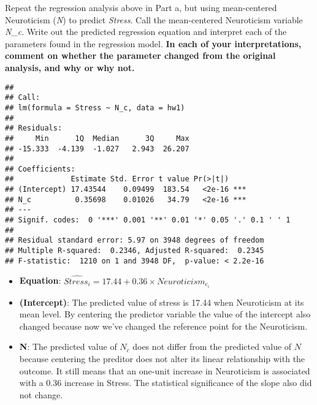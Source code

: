 \documentclass[
]{article}
\newenvironment{Shaded}{\begin{snugshade}}{\end{snugshade}}
\newcommand{\AttributeTok}[1]{\textcolor[rgb]{0.13,0.29,0.53}{#1}}
\newcommand{\ConstantTok}[1]{\textcolor[rgb]{0.56,0.35,0.01}{#1}}
\newcommand{\DocumentationTok}[1]{\textcolor[rgb]{0.56,0.35,0.01}{\textbf{\textit{#1}}}}
\newcommand{\FunctionTok}[1]{\textcolor[rgb]{0.13,0.29,0.53}{\textbf{#1}}}
\newcommand{\NormalTok}[1]{#1}
\newcommand{\OtherTok}[1]{\textcolor[rgb]{0.56,0.35,0.01}{#1}}
\newcommand{\SpecialCharTok}[1]{\textcolor[rgb]{0.81,0.36,0.00}{\textbf{#1}}}
\begin{document}
Repeat the regression analysis above in Part a, but using mean-centered
Neuroticism (\emph{N}) to predict \emph{Stress}. Call the mean-centered
Neuroticism variable \emph{N\_c}. Write out the predicted regression
equation and interpret each of the parameters found in the regression
model. \textbf{In each of your interpretations, comment on whether the
parameter changed from the original analysis, and why or why not.}

\begin{Shaded}
\end{Shaded}

\begin{verbatim}
## 
## Call:
## lm(formula = Stress ~ N_c, data = hw1)
## 
## Residuals:
##     Min      1Q  Median      3Q     Max 
## -15.333  -4.139  -1.027   2.943  26.207 
## 
## Coefficients:
##             Estimate Std. Error t value Pr(>|t|)    
## (Intercept) 17.43544    0.09499  183.54   <2e-16 ***
## N_c          0.35698    0.01026   34.79   <2e-16 ***
## ---
## Signif. codes:  0 '***' 0.001 '**' 0.01 '*' 0.05 '.' 0.1 ' ' 1
## 
## Residual standard error: 5.97 on 3948 degrees of freedom
## Multiple R-squared:  0.2346, Adjusted R-squared:  0.2345 
## F-statistic:  1210 on 1 and 3948 DF,  p-value: < 2.2e-16
\end{verbatim}

\begin{itemize}
\item
  \textbf{Equation}:
  \(\widehat{Stress_i} = 17.44 + 0.36 \times Neuroticism_{c_i}\)
\item
  \textbf{(Intercept)}: The predicted value of stress is 17.44 when
  Neuroticism at its mean level. By centering the predictor variable the
  value of the intercept also changed because now we've changed the
  reference point for the Neuroticism.
\item
  \textbf{N}: The predicted value of \(N_c\) does not differ from the
  predicted value of \(N\) because centering the preditor does not alter
  its linear relationship with the outcome. It still means that an
  one-unit increase in Neuroticism is associated with a 0.36 increase in
  Stress. The statistical significance of the slope also did not change.
\end{itemize}
\end{document}
